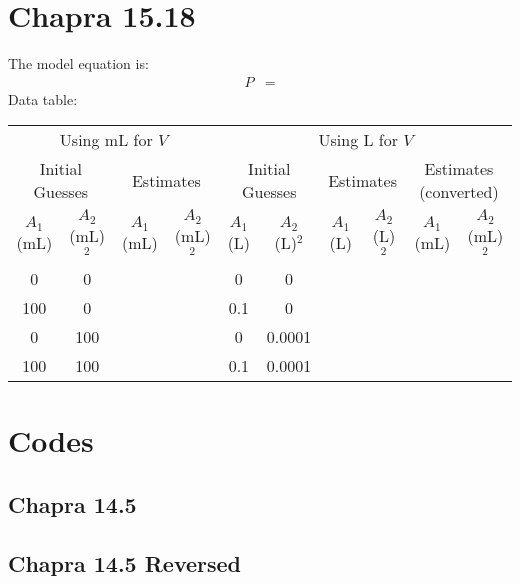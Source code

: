 \documentclass{article}
\begin{document}
\section{Chapra 15.18}
The model equation is:
\begin{align*}
P&=
\end{align*}
Data table:
\begin{center}
\begin{tabular}{|c|c|c|c|c|c|c|c|c|c|} \hline
\multicolumn{4}{|c|}{Using mL for $V$} & 
\multicolumn{6}{|c|}{Using L for $V$}\\
\multicolumn{2}{|c|}{Initial Guesses} & 
\multicolumn{2}{|c|}{Estimates} & 
\multicolumn{2}{|c|}{Initial Guesses} & 
\multicolumn{2}{|c|}{Estimates} & 
\multicolumn{2}{|c|}{Estimates (converted)} \\ 
$A_1$ (mL) & $A_2$ (mL)$^2$  & $A_1$ (mL)  & $A_2$ (mL)$^2$  & $A_1$ (L)  &
$A_2$ (L)$^2$ & $A_1$ (L) & $A_2$ (L)$^2$  & $A_1$ (mL) & $A_2$ (mL)$^2$  \\ \hline
0   & 0   & ~ & ~ & 0   & 0      & ~ & ~ & ~ & \\
100 & 0   & ~ & ~ & 0.1 & 0      & ~ & ~ & ~ & ~ \\
0   & 100 & ~ & ~ & 0   & 0.0001 & ~ & ~ & ~ & ~ \\
100 & 100 & ~ & ~ & 0.1 & 0.0001 & ~ & ~ & ~ & ~ \\ \hline
\end{tabular}
\end{center}

\pagebreak
\appendix
\section{Codes}
\lstset{style=python103, language=python} 

\subsection{Chapra 14.5}
%
\pagebreak

\subsection{Chapra 14.5 Reversed}
%
\pagebreak
\end{document}
